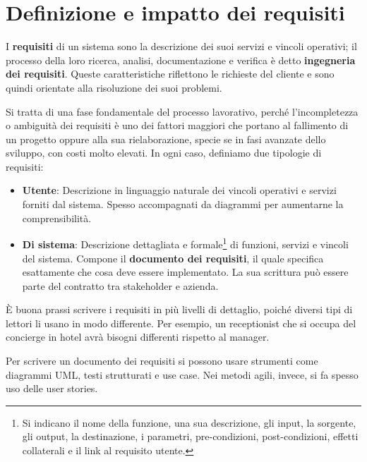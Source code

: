 \section{Definizione e impatto dei requisiti}
I \textbf{requisiti} di un sistema sono la descrizione dei suoi servizi e vincoli operativi; il processo della loro ricerca, analisi, documentazione e verifica è detto \textbf{ingegneria dei requisiti}. Queste caratteristiche riflettono le richieste del cliente e sono quindi orientate alla risoluzione dei suoi problemi.\par
Si tratta di una fase fondamentale del processo lavorativo, perché l'incompletezza o ambiguità dei requisiti è uno dei fattori maggiori che portano al fallimento di un progetto oppure alla sua rielaborazione, specie se in fasi avanzate dello sviluppo, con costi molto elevati. In ogni caso, definiamo due tipologie di requisiti: \begin{itemize}
	\item \textbf{Utente}: Descrizione in linguaggio naturale dei vincoli operativi e servizi forniti dal sistema. Spesso accompagnati da diagrammi per aumentarne la comprensibilità.
	\item \textbf{Di sistema}: Descrizione dettagliata e formale\footnote{Si indicano il nome della funzione, una sua descrizione, gli input, la sorgente, gli output, la destinazione, i parametri, pre-condizioni, post-condizioni, effetti collaterali e il link al requisito utente.} di funzioni, servizi e vincoli del sistema. Compone il \textbf{documento dei requisiti}, il quale specifica esattamente che cosa deve essere implementato. La sua scrittura può essere parte del contratto tra stakeholder e azienda.
\end{itemize}
\noindent È buona prassi scrivere i requisiti in più livelli di dettaglio, poiché diversi tipi di lettori li usano in modo differente. Per esempio, un receptionist che si occupa del concierge in hotel avrà bisogni differenti rispetto al manager.\par
Per scrivere un documento dei requisiti si possono usare strumenti come diagrammi UML, testi strutturati e use case. Nei metodi agili, invece, si fa spesso uso delle user stories.\newline

